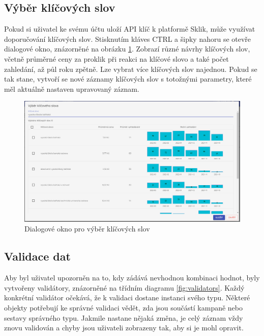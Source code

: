 \subsection{Výběr klíčových slov}
Pokud si uživatel ke svému účtu uloží API klíč k platformě Sklik, může využívat doporučování klíčových slov. Stisknutím kláves CTRL a šipky nahoru se otevře dialogové okno,
znázorněné na obrázku \ref{fig:keyword-dialog}. Zobrazí různé návrhy klíčových slov, včetně průměrné ceny za proklik při reakci na klíčové slovo a také počet zahledání, až půl roku zpětně.
Lze vybrat více klíčových slov najednou. Pokud se tak stane, vytvoří se nové záznamy klíčových slov s totožnými parametry, které měl aktuálně nastaven upravovaný záznam.  

\begin{figure}[h]
    \centering
    \includegraphics[width=1\textwidth]{Figures/ui/keyword-dialog.png}
    \caption{Dialogové okno pro výběr klíčových slov}
    \label{fig:keyword-dialog}
\end{figure}

\subsection{Validace dat}
Aby byl uživatel upozorněn na to, kdy zádává nevhodnou kombinaci hodnot, byly vytvořeny validátory, znázorněné na třídním diagramu \ref{fig:validators}. Každý konkrétní validátor
očekává, že k validaci dostane instanci svého typu. Některé objekty potřebují ke správné validaci vědět, zda jsou součástí kampaně nebo sestavy správného typu.
Jakmile nastane nějaká změna, je celý záznam vždy znovu validován a chyby jsou uživateli zobrazeny tak, aby si je mohl opravit.

